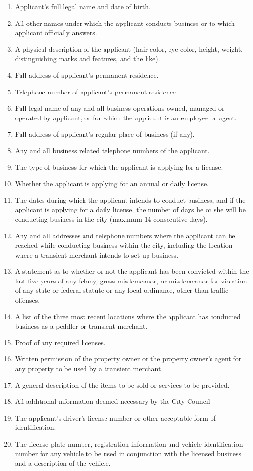 \begin{enumerate}[{\indent}1)]
    \item Applicant’s full legal name and date of birth.
    \item All other names under which the applicant conducts business or to which applicant officially answers.
    \item A physical description of the applicant (hair color, eye color, height, weight, distinguishing marks and features, and the like).
    \item Full address of applicant's permanent residence.
    \item Telephone number of applicant’s permanent residence.
    \item Full legal name of any and all business operations owned, managed or operated by applicant, or for which the applicant is an employee or agent.
    \item Full address of applicant's regular place of business (if any).
    \item Any and all business related telephone numbers of the applicant.
    \item The type of business for which the applicant is applying for a license.
    \item Whether the applicant is applying for an annual or daily license.
    \item The dates during which the applicant intends to conduct business, and if the applicant is applying for a daily license, the number of days he or she will be conducting business in the city (maximum 14 consecutive days).
    \item Any and all addresses and telephone numbers where the applicant can be reached while conducting business within the city, including the location where a transient merchant intends to set up business.
    \item A statement as to whether or not the applicant has been convicted within the last five years of any felony, gross misdemeanor, or misdemeanor for violation of any state or federal statute or any local ordinance, other than traffic offenses.
    \item A list of the three most recent locations where the applicant has conducted business as a peddler or transient merchant.
    \item Proof of any required licenses.
    \item Written permission of the property owner or the property owner’s agent for any property to be used by a transient merchant.
    \item A general description of the items to be sold or services to be provided.
    \item All additional information deemed necessary by the City Council.
    \item The applicant's driver's license number or other acceptable form of identification.
    \item The license plate number, registration information and vehicle identification number for any vehicle to be used in conjunction with the licensed business and a description of the vehicle.
\end{enumerate}
